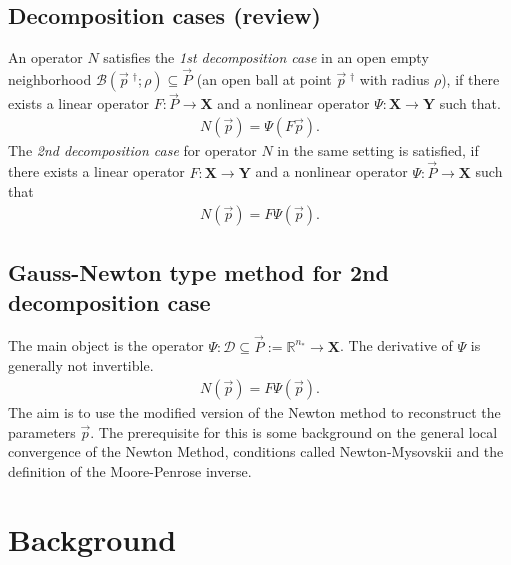 \subsection{Decomposition cases (review)}
An operator $N$ satisfies the \textit{1st decomposition case} in an open empty
neighborhood $\mathcal{B}\left(\vec{p}\;^{\dagger}; \rho \right) \subseteq
\vec{P} $ (an open ball at point $\vec{p}\;^{\dagger}$ with radius $\rho$), if
there exists a linear operator $F:\vec{P}\to \mathbf{X}$ and a nonlinear
operator $\Psi:\mathbf{X} \to \mathbf{Y}$ such that.
\begin{align}
    N(\vec{p}) = \Psi(F\vec{p}).
\end{align}
The \textit{2nd decomposition case} for operator $N$ in the same setting is
satisfied, if there exists a linear operator $F: \mathbf{X} \to \mathbf{Y}$
and a nonlinear operator $\Psi: \vec{P} \to \mathbf{X}$ such that
\begin{align}
    N(\vec{p}) = F\Psi(\vec{p}).
\end{align}

\subsection{Gauss-Newton type method for 2nd decomposition case}
The main object is the operator $\Psi:\mathcal{D} \subseteq \vec{P} :=
\mathbb{R}^{n_*} \to \mathbf{X}$. The derivative of $\Psi$ is generally not
invertible.
\begin{align}
    N(\vec{p}) = F\Psi(\vec{p}).
\end{align}
The aim is to use the modified version of the Newton method to reconstruct
the parameters $\vec{p}$. The prerequisite for this is some background on the
general local convergence of the Newton Method, conditions called
Newton-Mysovskii and the definition of the Moore-Penrose inverse.
\section{Background}

